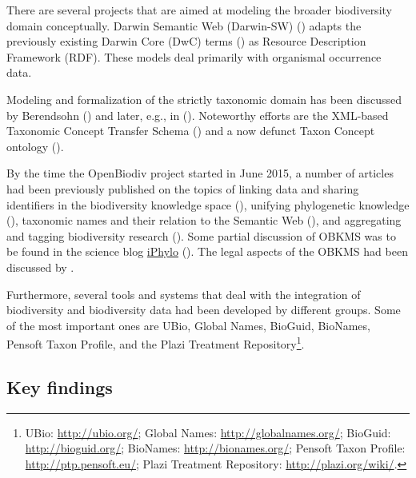 There are several projects that are aimed at modeling the broader biodiversity domain conceptually. Darwin Semantic Web (Darwin-SW) (\cite{baskauf_darwin-sw:_2016}) adapts the previously existing Darwin Core (DwC) terms (\cite{wieczorek_darwin_2012}) as Resource Description Framework (RDF). These models deal primarily with organismal occurrence data.

Modeling and formalization of the strictly taxonomic domain has been discussed by Berendsohn (\cite{berendsohn_concept_1995}) and later, e.g., in (\cite{franz_perspectives:_2009,sterner_taxonomy_2017}). Noteworthy efforts are the XML-based Taxonomic Concept Transfer Schema (\cite{taxonomic_names_and_concepts_interest_group_taxonomic_2006}) and a now defunct Taxon Concept ontology (\cite{devries_taxon_nodate}).

By the time the OpenBiodiv project started in June 2015, a number of articles had been previously published on the topics of linking data and sharing identifiers in the biodiversity knowledge space (\cite{page_biodiversity_2008}), unifying phylogenetic knowledge (\cite{parr_evolutionary_2012}), taxonomic names and their relation to the Semantic Web (\cite{page_taxonomic_2006,patterson_names_2010}), and aggregating and tagging biodiversity research (\cite{mindell_aggregating_2011}). Some partial discussion of OBKMS was to be found in the science blog \href{http://iphylo.blogspot.bg}{iPhylo} (\cite{page_vision_2014, page_putting_2015}). The legal aspects of the OBKMS had been discussed by \cite{egloff_open_2014}.

Furthermore, several tools and systems that deal with the integration of biodiversity and biodiversity data had been developed by different groups. Some of the most important ones are UBio, Global Names, BioGuid, BioNames, Pensoft Taxon Profile, and the Plazi Treatment Repository\footnote{UBio: \href{http://ubio.org/}{http://ubio.org/}; Global Names: \href{http://globalnames.org/}{http://globalnames.org/}; BioGuid: \href{http://bioguid.org/}{http://bioguid.org/}; BioNames: \href{http://bionames.org/}{http://bionames.org/}; Pensoft Taxon Profile: \href{http://ptp.pensoft.eu/}{http://ptp.pensoft.eu/}; Plazi Treatment Repository: \href{http://plazi.org/wiki/}{http://plazi.org/wiki/}.}.

\subsection*{Key findings}

